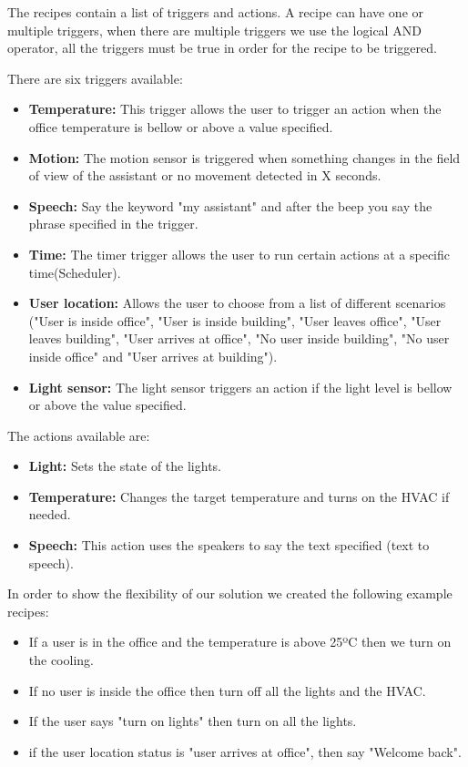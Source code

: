 The recipes contain a list of triggers and actions. A recipe can have one or multiple triggers, when there are multiple triggers we use the logical AND operator, all the triggers must be true in order for the recipe to be triggered.

There are six triggers available:

\begin{itemize}
  \item \textbf{Temperature:} This trigger allows the user to trigger an action when the office temperature is bellow or above a value specified.
  \item \textbf{Motion:} The motion sensor is triggered when something changes in the field of view of the assistant or no movement detected in X seconds.
  \item \textbf{Speech:} Say the keyword "my assistant" and after the beep you say the phrase specified in the trigger.  
  \item \textbf{Time:} The timer trigger allows the user to run certain actions at a specific time(Scheduler).  
  \item \textbf{User location:} Allows the user to choose from a list of different scenarios ("User is inside office", "User is inside building", "User leaves office", "User leaves building", "User arrives at office", "No user inside building", "No user inside office" and "User arrives at building").
  \item \textbf{Light sensor:} The light sensor triggers an action if the light level is bellow or above the value specified.
  
\end{itemize}

The actions available are:

\begin{itemize}
  \item \textbf{Light:} Sets the state of the lights.
  \item \textbf{Temperature:} Changes the target temperature and turns on the HVAC if needed.
  \item \textbf{Speech:} This action uses the speakers to say the text specified (text to speech).
\end{itemize}


In order to show the flexibility of our solution we created the following example recipes:
\begin{itemize}
  \item If a user is in the office and the temperature is above 25ºC then we turn on the cooling.
  \item If no user is inside the office then turn off all the lights and the HVAC.
  \item If the user says "turn on lights" then turn on all the lights.
  \item if the user location status is "user arrives at office", then say "Welcome back".
 
\end{itemize}



